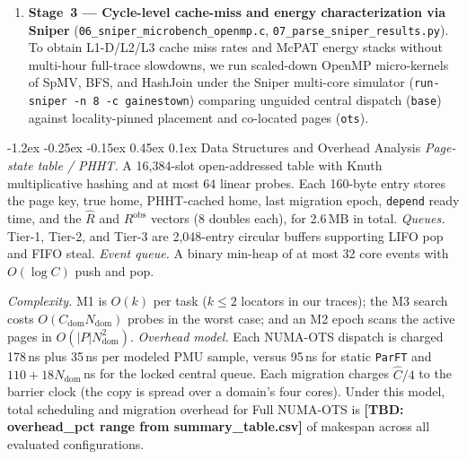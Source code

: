 \documentclass[10pt,twocolumn,letterpaper]{article}
\makeatletter
\renewcommand{\subsection}{\@startsection{subsection}{2}{\z@}%
  {-1.2ex \@plus -0.25ex \@minus -0.15ex}%
  {0.45ex \@plus 0.1ex}%
  {\normalfont\small\itshape}}
\newcommand{\TBD}[1]{\textbf{[TBD: #1]}}
\makeatother
\begin{document}
\begin{enumerate}
\item \textbf{Stage~3 --- Cycle-level cache-miss and energy characterization via Sniper} (\texttt{06\_sniper\_microbench\_openmp.c}, \texttt{07\_parse\_sniper\_results.py}). To obtain L1-D/L2/L3 cache miss rates and McPAT energy stacks without multi-hour full-trace slowdowns, we run scaled-down OpenMP micro-kernels of SpMV, BFS, and HashJoin under the Sniper multi-core simulator (\texttt{run-sniper -n 8 -c gainestown}) comparing unguided central dispatch (\texttt{base}) against locality-pinned placement and co-located pages (\texttt{ots}).
\end{enumerate}

\subsection{Data Structures and Overhead Analysis}
\textit{Page-state table / PHHT.} A 16,384-slot open-addressed table with Knuth multiplicative hashing and at most 64 linear probes. Each 160-byte entry stores the page key, true home, PHHT-cached home, last migration epoch, \texttt{depend} ready time, and the $\widehat{R}$ and $R^{\mathrm{obs}}$ vectors (8 doubles each), for 2.6\,MB in total. \textit{Queues.} Tier-1, Tier-2, and Tier-3 are 2,048-entry circular buffers supporting LIFO pop and FIFO steal. \textit{Event queue.} A binary min-heap of at most 32 core events with $O(\log C)$ push and pop.

\textit{Complexity.} M1 is $O(k)$ per task ($k \le 2$ locators in our traces); the M3 search costs $O(C_{\mathrm{dom}} N_{\mathrm{dom}})$ probes in the worst case; and an M2 epoch scans the active pages in $O(|P| N_{\mathrm{dom}}^2)$. \textit{Overhead model.} Each NUMA-OTS dispatch is charged 178\,ns plus 35\,ns per modeled PMU sample, versus 95\,ns for static \texttt{ParFT} and $110 + 18N_{\mathrm{dom}}$\,ns for the locked central queue. Each migration charges $\widehat{C}/4$ to the barrier clock (the copy is spread over a domain's four cores). Under this model, total scheduling and migration overhead for Full NUMA-OTS is \TBD{overhead\_pct range from summary\_table.csv} of makespan across all evaluated configurations.
\end{document}
